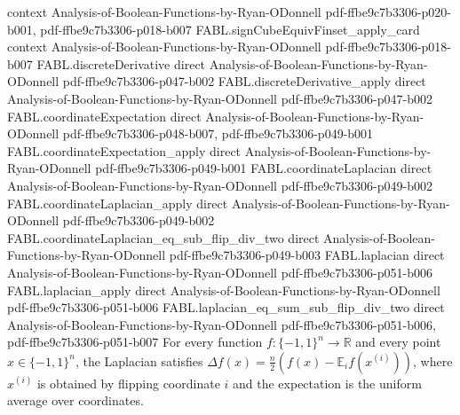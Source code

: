 \begin{theorem}
  {context}
  {Analysis-of-Boolean-Functions-by-Ryan-ODonnell}
  {pdf-ffbe9c7b3306-p020-b001,
    pdf-ffbe9c7b3306-p018-b007}
\proofstep
  {FABL.signCubeEquivFinset_apply_card}
  {context}
  {Analysis-of-Boolean-Functions-by-Ryan-ODonnell}
  {pdf-ffbe9c7b3306-p018-b007}
\proofstep
  {FABL.discreteDerivative}
  {direct}
  {Analysis-of-Boolean-Functions-by-Ryan-ODonnell}
  {pdf-ffbe9c7b3306-p047-b002}
\proofstep
  {FABL.discreteDerivative_apply}
  {direct}
  {Analysis-of-Boolean-Functions-by-Ryan-ODonnell}
  {pdf-ffbe9c7b3306-p047-b002}
\proofstep
  {FABL.coordinateExpectation}
  {direct}
  {Analysis-of-Boolean-Functions-by-Ryan-ODonnell}
  {pdf-ffbe9c7b3306-p048-b007,
    pdf-ffbe9c7b3306-p049-b001}
\proofstep
  {FABL.coordinateExpectation_apply}
  {direct}
  {Analysis-of-Boolean-Functions-by-Ryan-ODonnell}
  {pdf-ffbe9c7b3306-p049-b001}
\proofstep
  {FABL.coordinateLaplacian}
  {direct}
  {Analysis-of-Boolean-Functions-by-Ryan-ODonnell}
  {pdf-ffbe9c7b3306-p049-b002}
\proofstep
  {FABL.coordinateLaplacian_apply}
  {direct}
  {Analysis-of-Boolean-Functions-by-Ryan-ODonnell}
  {pdf-ffbe9c7b3306-p049-b002}
\proofstep
  {FABL.coordinateLaplacian_eq_sub_flip_div_two}
  {direct}
  {Analysis-of-Boolean-Functions-by-Ryan-ODonnell}
  {pdf-ffbe9c7b3306-p049-b003}
\proofstep
  {FABL.laplacian}
  {direct}
  {Analysis-of-Boolean-Functions-by-Ryan-ODonnell}
  {pdf-ffbe9c7b3306-p051-b006}
\proofstep
  {FABL.laplacian_apply}
  {direct}
  {Analysis-of-Boolean-Functions-by-Ryan-ODonnell}
  {pdf-ffbe9c7b3306-p051-b006}
\proofstep
  {FABL.laplacian_eq_sum_sub_flip_div_two}
  {direct}
  {Analysis-of-Boolean-Functions-by-Ryan-ODonnell}
  {pdf-ffbe9c7b3306-p051-b006,
    pdf-ffbe9c7b3306-p051-b007}
For every function $f:\{-1,1\}^n\to\mathbb R$ and every point $x\in\{-1,1\}^n$, the
Laplacian satisfies $\Delta f(x)=\frac n2\left(f(x)-\mathbb E_i f(x^{(i)})\right)$,
where $x^{(i)}$ is obtained by flipping coordinate $i$ and the expectation is the
uniform average over coordinates.
\end{theorem}

